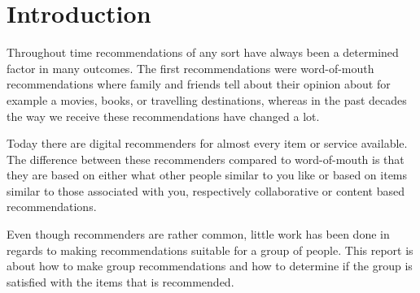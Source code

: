 \chapter{Introduction} 
Throughout time recommendations of any sort have always been a determined factor in many outcomes.
The first recommendations were word-of-mouth recommendations where family and friends tell about their opinion about for example a movies, books, or travelling destinations, whereas in the past decades the way we receive these recommendations have changed a lot.

Today there are digital recommenders for almost every item or service available. The difference between these recommenders compared to word-of-mouth is that they are based on either what other people similar to you like or based on items similar to those associated with you, respectively collaborative or content based recommendations.

Even though recommenders are rather common, little work has been done in regards to making recommendations suitable for a group of people. This report is about how to make group recommendations and how to determine if the group is satisfied with the items that is recommended.

